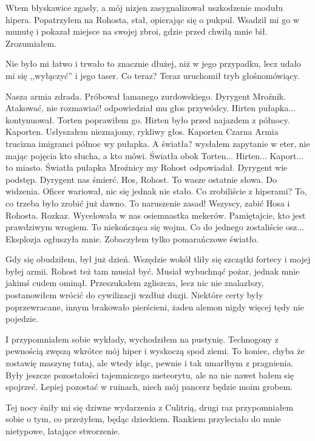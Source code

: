 Wtem błyskawice zgasły, a mój nizjen zasygnalizował uszkodzenie modułu hipera.
Popatrzyłem na Rohosta, stał, opierając się o pukpul.
Wsadził mi go w munutę i pokazał miejsce na swojej zbroi, gdzie przed chwilą mnie bił.
Zrozumiałem.

Nie było mi łatwo i trwało to znacznie dłużej, niż w jego przypadku, lecz udało mi się ,,wyłączyć'' i jego taser.
Co teraz?
Teraz uruchomił tryb głośnomówiący.
\begin{dialogue}
\ds{} Nasza armia zdrada. \dm{} Próbował łamanego zurdowskiego. \dm{} Dyrygent Mroźnik.
\ds{} Atakować, nie rozmawiać! \dm{} odpowiedział mu głos przywódcy.
\ds{} Hirten pułapka... \dm{} kontynuował.
\ds{} Torten \dm{} poprawiłem go. \dm{} Hirten było przed najazdem z północy.
\ds{} Kaporten. \dm{} Usłyszałem nieznajomy, rykliwy głos. \dm{} Kaporten Czarna Armia trucizna imigranci północ wy pułapka.
\ds{} A światła? \dm{} wysłałem zapytanie w eter, nie mając pojęcia kto słucha, a kto mówi. \dm{} Światła obok Torten... Hirten... Kaport... to miasto.
\ds{} Światła pułapka Mroźnicy my \dm{} Rohost odpowiadał. \dm{} Dyrygent wie podstęp. Dyrygent nas śmierć.
\ds{} Hos, Rohost. To wasze ostatnie słowa. Do widzenia. \dm{} Oficer wariował, nic się jednak nie stało. \dm{} Co zrobiliście z hiperami?
\ds{} To, co trzeba było zrobić już dawno.
\ds{} To naruszenie zasad! Wszyscy, zabić Hosa i Rohosta. Rozkaz. \dm{} Wycelowała w nas osiemnastka mekerów.
\ds{} Pamiętajcie, kto jest prawdziwym wrogiem. To niekończąca się wojna. Co do jednego zostaliście osz... \dm{} Eksplozja ogłuszyła mnie. Zobaczyłem tylko pomarańczowe światło.
\end{dialogue}

Gdy się obudziłem, był już dzień. Wszędzie wokół tliły się szczątki fortecy i mojej byłej armii.
Rohost też tam musiał być.
Musiał wybuchnąć pożar, jednak mnie jakimś cudem ominął.
Przeszukałem zgliszcza, lecz nic nie znalazłszy, postanowiłem wrócić do cywilizacji wzdłuż duzji. 
Niektóre certy były poprzewracane, innym brakowało pierścieni, żaden alemon nigdy więcej tędy nie pojedzie.

I przypomniałem sobie wykłady, wychodziłem na pustynię. Technogony z pewnością zwęszą wkrótce mój hiper i wyskoczą spod ziemi.
To koniec, chyba że zostawię maszynę tutaj, ale wtedy idąc, pewnie i tak umarłbym z pragnienia.
Były jeszcze pozostałości tajemniczego meteorytu, ale na nie nawet bałem się spojrzeć.
Lepiej pozostać w ruinach, niech mój pancerz będzie moim grobem.

Tej nocy śniły mi się dziwne wydarzenia z Culitrią, drugi raz przypomniałem sobie o tym, co przeżyłem, będąc dzieckiem.
Rankiem przyleciało do mnie nietypowe, latające stworzenie.

